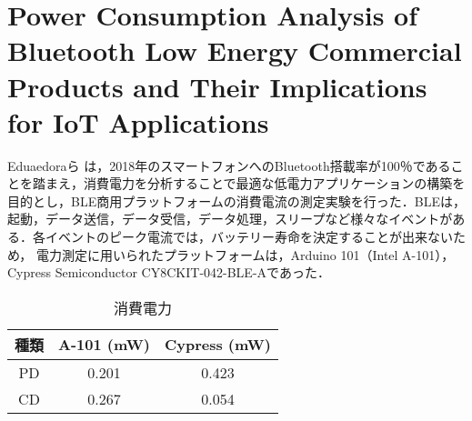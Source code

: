 \section{Power Consumption Analysis of Bluetooth Low Energy Commercial Products and Their Implications for IoT Applications}
Eduaedoraら は，2018年のスマートフォンへのBluetooth搭載率が100％であることを踏まえ，消費電力を分析することで最適な低電力アプリケーションの構築を目的とし，BLE商用プラットフォームの消費電流の測定実験を行った\cite{Garcia-Espinosa2018}．BLEは，起動，データ送信，データ受信，データ処理，スリープなど様々なイベントがある．各イベントのピーク電流では，バッテリー寿命を決定することが出来ないため，
電力測定に用いられたプラットフォームは，Arduino 101（Intel A-101），Cypress
Semiconductor CY8CKIT-042-BLE-Aであった．

\begin{table}
    \raggedleft
    \caption{消費電力}
    \label{fig:power_consumption}
    \centering
    \begin{tabular}{|c|c|c|}
    \hline
    \textbf{種類} & \textbf{A-101 (mW)} & \textbf{Cypress (mW)} \\ \hline
    PD          & 0.201               & 0.423                 \\ \hline
    CD          & 0.267               & 0.054                 \\ \hline
    \end{tabular}
\end{table}
